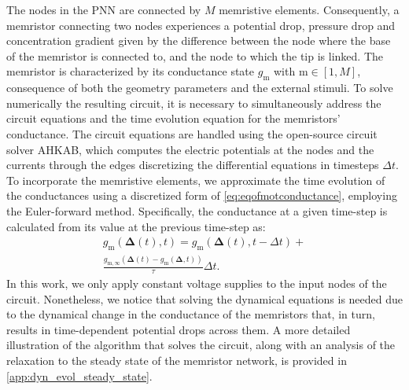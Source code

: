 \documentclass[reprint,superscriptaddress,prb,showkeys]{revtex4-2}
\newcommand{\m}{\text{m}} %
\newcommand{\brac}[1]{\left(#1 \right)} %
\begin{document}
The nodes in the PNN are connected by $M$ memristive elements. Consequently, a memristor connecting two nodes experiences a potential drop, pressure drop and concentration gradient given by the difference between the node where the base of the memristor is connected to, and the node to which the tip is linked. The memristor is characterized by its conductance state $g_{\m}$ with $\m\in[1,M]$, consequence of both the geometry parameters and the external stimuli.
To solve numerically the resulting circuit, it is necessary to simultaneously address the circuit equations and the time evolution equation for the memristors' conductance. 
The circuit equations are handled using the open-source circuit solver \textsc{AHKAB}\cite{}, which computes the electric potentials at the nodes and the currents through the edges discretizing the differential equations in timesteps $\Delta t$. To incorporate the memristive elements, we approximate the time evolution of the conductances using a discretized form of \cref{eq:eqofmotconductance}, employing the Euler-forward method. Specifically, the conductance at a given time-step is calculated from its value at the previous time-step as:
\begin{multline}
    g_{\m}\brac{\boldsymbol{\Delta}(t), t} = g_{\m}\brac{\boldsymbol{\Delta}(t), t-\Delta t} + \\
    \frac{g_{\m,\infty}\brac{\boldsymbol{\Delta}(t)-g_{\m}\brac{\boldsymbol{\Delta}, t}}}{\tau}\Delta t.
\end{multline}
In this work, we only apply constant voltage supplies to the input nodes of the circuit. Nonetheless, we notice that solving the dynamical equations is needed due to the dynamical change in the conductance of the memristors that, in turn, results in time-dependent potential drops across them. A more detailed illustration of the algorithm that solves the circuit, along with an analysis of the relaxation to the steady state of the memristor network, is provided in \cref{app:dyn_evol_steady_state}.
\end{document}
